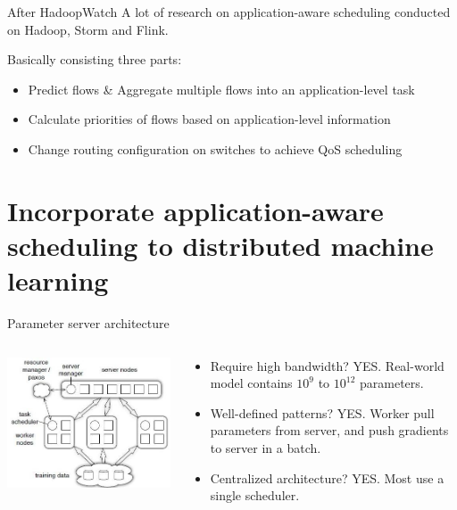 \documentclass{beamer}
\begin{document}
\begin{frame}{After HadoopWatch}
A lot of research on application-aware scheduling conducted on Hadoop, Storm and Flink.

Basically consisting three parts:
\begin{itemize}
    \item Predict flows \& Aggregate multiple flows into an application-level task
    \item Calculate priorities of flows based on application-level information
    \item Change routing configuration on switches to achieve QoS scheduling
\end{itemize}
\end{frame}

\section{Incorporate application-aware scheduling to distributed machine learning}
\begin{frame}{Parameter server architecture}
\begin{columns}
    \begin{column}{0.5\linewidth}
        \centering
        \includegraphics[scale=.35]{parameter-server.jpg}
    \end{column}
    \begin{column}{0.5\linewidth}
        \begin{itemize}
            \item Require high bandwidth? YES. Real-world model contains $10^9$ to $10^{12}$ parameters. \footnotemark
            \item Well-defined patterns? YES. Worker pull parameters from server, and push gradients to server in a batch.
            \item Centralized architecture? YES. Most use a single scheduler.
        \end{itemize}
    \end{column}
\end{columns}

\end{frame}
\end{document}

